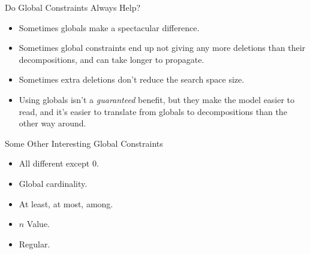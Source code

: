 \documentclass{beamer}
\begin{document}
\begin{frame}{Do Global Constraints Always Help?}
    \begin{itemize}
        \item Sometimes globals make a spectacular difference.

        \item Sometimes global constraints end up not giving any more deletions than their
            decompositions, and can take longer to propagate.

        \item Sometimes extra deletions don't reduce the search space size.

        \item Using globals isn't a \emph{guaranteed} benefit, but they make the model easier to
            read, and it's easier to translate from globals to decompositions than the other way
            around.
    \end{itemize}
\end{frame}

\begin{frame}{Some Other Interesting Global Constraints}

    \begin{itemize}
        \item All different except 0.
        \item Global cardinality.
        \item At least, at most, among.
        \item $n$ Value.
        \item Regular.
    \end{itemize}

\end{frame}
\end{document}
